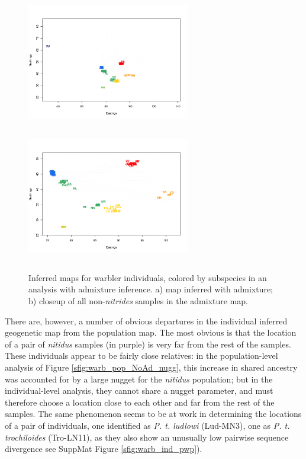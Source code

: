 \documentclass[12pt]{article}
\newcommand{\plr}[1]{{\it\color{purple}{(#1)}}}
\begin{document}
\begin{figure}
	\centering
			{\includegraphics[width=2.8in,height=2.3in]{figs/warblers/individual_warbler_map_arrows_randpr1.png}}
			{\includegraphics[width=2.8in,height=2.3in]{figs/warblers/individual_warbler_map_arrows_randpr1_closeup.png}}
	\caption{
    Inferred maps for warbler individuals, colored by subspecies in an analysis with admixture inference. 
    \plr{put legend for colors}
    a) map inferred with admixture; b) closeup of all non-\textit{nitrides} samples in the admixture map.
    \plr{labels are hard to read on the right.  This would be better put next to the sample map for comparison?}
}\label{sfig:warbler_ind_maps}
\end{figure}

There are, however, a number of obvious departures in the individual inferred geogenetic map from the population map.  The most obvious is that the location of a pair of \textit{nitidus} samples (in purple) is very far from the rest of the samples.  
These individuals appear to be fairly close relatives:
in the population-level analysis of Figure \ref{sfig:warb_pop_NoAd_nugg},
this increase in shared ancestry was accounted for by a large nugget for the \textit{nitidus} population;
but in the individual-level analysis, they cannot share a nugget parameter, 
and must therefore choose a location close to each other and far from the rest of the samples.
The same phenomenon seems to be at work in determining the locations of a pair of individuals, one identified as \textit{P. t. ludlowi} (Lud-MN3), one as \textit{P. t. trochiloides} (Tro-LN11), 
as they also show an unusually low pairwise sequence divergence see SuppMat Figure \ref{sfig:warb_ind_pwp}).
\end{document}
